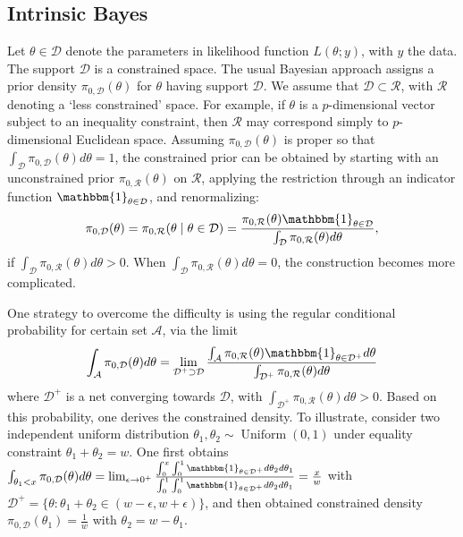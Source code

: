 \documentclass[10pt]{article}
\newcommand{\mc}[1]{\mathcal{#1}}
\DeclareMathOperator{\U}{Uniform}
\DeclareMathOperator{\1}{\mathbbm{1}}
\begin{document}
\subsection{Intrinsic Bayes}
Let $\theta \in \mc D$ denote the parameters in likelihood function $L(\theta;y)$, with $y$ the data. The support $\mc D$ is a constrained space. The usual Bayesian approach assigns a prior density $\pi_{0,\mc D}(\theta)$ for $\theta$ having support $\mc D$. We assume that $\mc D \subset \mc R$, with $\mc R$ denoting a `less constrained' space. For example, if $\theta$ is a $p$-dimensional vector subject to an inequality constraint, then $\mc R$ may correspond simply to $p$-dimensional Euclidean space.
Assuming $\pi_{0,\mc D}(\theta)$ is proper so that $\int_{\mc D} \pi_{0,\mc D}(\theta) d\theta =1$, the constrained prior can be obtained by starting with an unconstrained prior $\pi_{0,\mc R}(\theta)$ on $\mc R$, applying the restriction through an indicator function $\mathbbm{1}_{\theta\in \mc D}$, and renormalizing:
\begin{equation}
\begin{aligned}
\label{exact_prior1}
\pi_{0,\mc D}(\theta)= \pi_{0,\mc R}(\theta \mid \theta \in \mc D) = \frac{ \pi_{0,\mc R}(\theta) \mathbbm{1}_{\theta\in \mc D} }{ \int_{\mc D} \pi_{0,\mc R}(\theta)d\theta },
\end{aligned}
\end{equation}
if $ \int_{\mc D} \pi_{0,\mc R}(\theta)d\theta >0$. When $ \int_{\mc D} \pi_{0,\mc R}(\theta)d\theta =0$, the construction becomes more complicated.

 One strategy to overcome the difficulty is using the regular conditional probability for certain set $\mc A$, via the limit
\begin{equation}
\begin{aligned}
\label{exact_prior2}
\int_{\mc A} \pi_{0,\mc D}(\theta) d\theta=\lim_{\mc D^+\supset \mc D} \frac{\int_{\mc A} \pi_{0,\mc R}(\theta) \mathbbm{1}_{\theta\in \mc D^+ } d\theta}{ \int_{\mc D^+} \pi_{0,\mc R}(\theta)d\theta }\end{aligned}
\end{equation}
where $\mc D^+$ is a net converging towards $\mc D$, with $\int_{\mc D^+} \pi_{0,\mc R}(\theta)d\theta>0$. Based on this probability, one derives the constrained density. To illustrate, consider two independent uniform distribution $\theta_1,\theta_2 \sim \U(0,1)$ under equality constraint $\theta_1+\theta_2=w$. One first obtains $\int_{\theta_1<x}\pi_{0,\mc D}(\theta) d\theta=\lim_{\epsilon\rightarrow 0^+} \frac{ \int_0^{x} \int_0^1 \mathbbm{1}_{\theta\in \mc D^+}  d\theta_2d\theta_1} { \int_0^1 \int_0^1 \mathbbm{1}_{\theta\in \mc D^+}  d\theta_2d\theta_1 } =\frac{x}{w}$ with $\mc D^+= \{ \theta: \theta_1+\theta_2\in (w-\epsilon, w+\epsilon)\}$, and then obtained constrained density $\pi_{0,\mc D}(\theta_1)= \frac{1}{w}$ with $\theta_2=w-\theta_1$.
\end{document}
